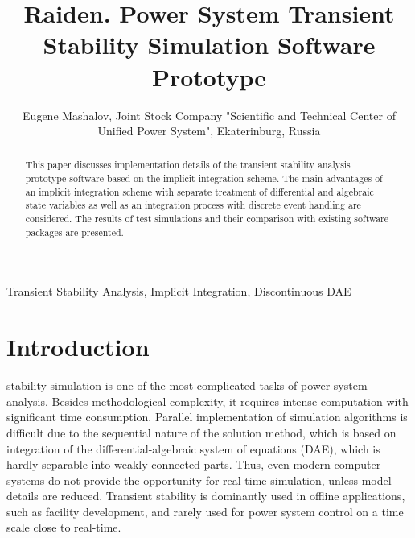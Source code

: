 \documentclass[lettersize,journal]{IEEEtran}
\begin{document}
\title{Raiden. Power System Transient Stability Simulation Software Prototype}

\author {Eugene Mashalov, Joint Stock Company "Scientific and Technical Center of Unified Power System", Ekaterinburg, Russia}




\maketitle

\begin{abstract}
This paper discusses implementation details of the transient stability analysis prototype software based on the implicit integration scheme. The main advantages of an implicit integration scheme with separate treatment of differential and algebraic state variables as well as an integration process with discrete event handling are considered. The results of test simulations and their comparison with existing software packages are presented.
\end{abstract}

\begin{IEEEkeywords}
Transient Stability Analysis, Implicit Integration, Discontinuous DAE
\end{IEEEkeywords}

\section{Introduction}
 stability simulation is one of the most complicated tasks of power system analysis. Besides methodological complexity, it requires intense computation with significant time consumption. Parallel implementation of simulation algorithms is difficult due to the sequential nature of the solution method, which is based on integration of the differential-algebraic system of equations (DAE), which is hardly separable into weakly connected parts. Thus, even modern computer systems do not provide the opportunity for real-time simulation, unless model details are reduced. Transient stability is dominantly used in offline applications, such as facility development, and rarely used for power system control on a time scale close to real-time.
\end{document}
